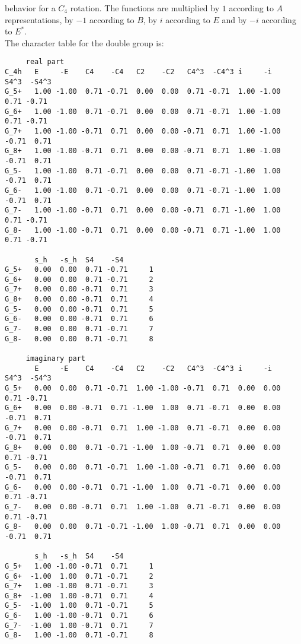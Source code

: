 \documentclass[12pt,a4paper]{article}
\begin{document}
behavior for a $C_4$ rotation. The functions are multiplied by 
$1$ according to $A$ representations, by $-1$ according to $B$,
by $i$ according to $E$ and by $-i$ according to $E^*$. \\
The character table for the double group is:
\begin{footnotesize}
\begin{verbatim}
     real part
C_4h   E     -E    C4    -C4   C2    -C2   C4^3  -C4^3 i     -i    S4^3  -S4^3
G_5+   1.00 -1.00  0.71 -0.71  0.00  0.00  0.71 -0.71  1.00 -1.00  0.71 -0.71
G_6+   1.00 -1.00  0.71 -0.71  0.00  0.00  0.71 -0.71  1.00 -1.00  0.71 -0.71
G_7+   1.00 -1.00 -0.71  0.71  0.00  0.00 -0.71  0.71  1.00 -1.00 -0.71  0.71
G_8+   1.00 -1.00 -0.71  0.71  0.00  0.00 -0.71  0.71  1.00 -1.00 -0.71  0.71
G_5-   1.00 -1.00  0.71 -0.71  0.00  0.00  0.71 -0.71 -1.00  1.00 -0.71  0.71
G_6-   1.00 -1.00  0.71 -0.71  0.00  0.00  0.71 -0.71 -1.00  1.00 -0.71  0.71
G_7-   1.00 -1.00 -0.71  0.71  0.00  0.00 -0.71  0.71 -1.00  1.00  0.71 -0.71
G_8-   1.00 -1.00 -0.71  0.71  0.00  0.00 -0.71  0.71 -1.00  1.00  0.71 -0.71

       s_h   -s_h  S4    -S4  
G_5+   0.00  0.00  0.71 -0.71     1
G_6+   0.00  0.00  0.71 -0.71     2
G_7+   0.00  0.00 -0.71  0.71     3
G_8+   0.00  0.00 -0.71  0.71     4
G_5-   0.00  0.00 -0.71  0.71     5
G_6-   0.00  0.00 -0.71  0.71     6
G_7-   0.00  0.00  0.71 -0.71     7
G_8-   0.00  0.00  0.71 -0.71     8

     imaginary part
       E     -E    C4    -C4   C2    -C2   C4^3  -C4^3 i     -i    S4^3  -S4^3
G_5+   0.00  0.00  0.71 -0.71  1.00 -1.00 -0.71  0.71  0.00  0.00  0.71 -0.71
G_6+   0.00  0.00 -0.71  0.71 -1.00  1.00  0.71 -0.71  0.00  0.00 -0.71  0.71
G_7+   0.00  0.00 -0.71  0.71  1.00 -1.00  0.71 -0.71  0.00  0.00 -0.71  0.71
G_8+   0.00  0.00  0.71 -0.71 -1.00  1.00 -0.71  0.71  0.00  0.00  0.71 -0.71
G_5-   0.00  0.00  0.71 -0.71  1.00 -1.00 -0.71  0.71  0.00  0.00 -0.71  0.71
G_6-   0.00  0.00 -0.71  0.71 -1.00  1.00  0.71 -0.71  0.00  0.00  0.71 -0.71
G_7-   0.00  0.00 -0.71  0.71  1.00 -1.00  0.71 -0.71  0.00  0.00  0.71 -0.71
G_8-   0.00  0.00  0.71 -0.71 -1.00  1.00 -0.71  0.71  0.00  0.00 -0.71  0.71

       s_h   -s_h  S4    -S4  
G_5+   1.00 -1.00 -0.71  0.71     1
G_6+  -1.00  1.00  0.71 -0.71     2
G_7+   1.00 -1.00  0.71 -0.71     3
G_8+  -1.00  1.00 -0.71  0.71     4
G_5-  -1.00  1.00  0.71 -0.71     5
G_6-   1.00 -1.00 -0.71  0.71     6
G_7-  -1.00  1.00 -0.71  0.71     7
G_8-   1.00 -1.00  0.71 -0.71     8

\end{verbatim}
\end{footnotesize}
\end{document}
